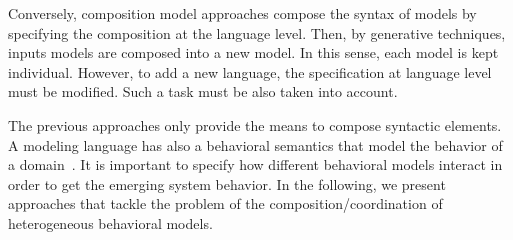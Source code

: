 Conversely, composition model approaches compose the syntax of models by specifying the composition at the language level. Then, by generative techniques, inputs models are composed into a new model. In this sense, each model is kept individual. However, to add a new language, the specification at language level must be modified. Such a task must be also taken into account.  

The previous approaches only provide the means to compose syntactic elements. A modeling language has also a behavioral semantics that model the behavior of a domain~\cite{?,?}. It is important to specify how different behavioral models interact in order to get the emerging system behavior. In the following, we present approaches that tackle the problem of the composition/coordination of heterogeneous behavioral models. 

